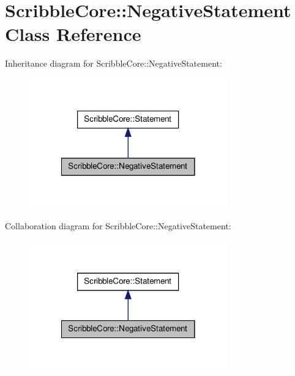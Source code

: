 \hypertarget{class_scribble_core_1_1_negative_statement}{\section{Scribble\-Core\-:\-:Negative\-Statement Class Reference}
\label{class_scribble_core_1_1_negative_statement}
}


Inheritance diagram for Scribble\-Core\-:\-:Negative\-Statement\-:\nopagebreak
\begin{figure}[H]
\begin{center}
\leavevmode
\includegraphics[width=242pt]{class_scribble_core_1_1_negative_statement__inherit__graph}
\end{center}
\end{figure}


Collaboration diagram for Scribble\-Core\-:\-:Negative\-Statement\-:\nopagebreak
\begin{figure}[H]
\begin{center}
\leavevmode
\includegraphics[width=242pt]{class_scribble_core_1_1_negative_statement__coll__graph}
\end{center}
\end{figure}
